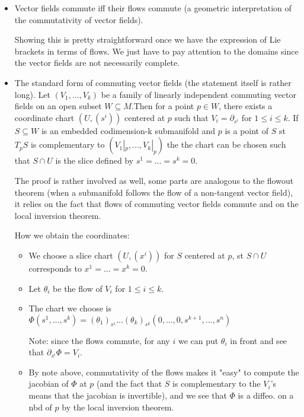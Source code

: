 \documentclass{report}
\theoremstyle{definition}
\begin{document}
\begin{itemize}
    \item Vector fields commute iff their flows commute (a geometric interpretation of the commutativity of vector fields).

    Showing this is pretty straightforward once we have the expression of Lie brackets in terms of flows. We just have to pay attention to the domains since the vector fields are not necessarily complete.
    \item \label{StandardFormCommutingFields} The standard form of commuting vector fields (the statement itself is rather long). Let $(V_1,...,V_k)$ be a family of linearly independent commuting vector fields on an open subset $W\subseteq M$.Then for a point $p\in W$, there exists a coordinate chart $(U,(s^i))$ centered at $p$ such that $V_i=\partial_{s^i}$ for $1\leq i\leq k$. If $S\subseteq W$ is an embedded codimension-k submanifold and $p$ is a point of $S$ st $T_pS$ is complementary to $(V_1|_p,...,V_k|_p)$ the the chart can be chosen such that $S\cap U$ is the slice defined by $s^1=...=s^k=0$.

    The proof is rather involved as well, some parts are analogous to the flowout theorem (when a submanifold follows the flow of a non-tangent vector field), it relies on the fact that flows of commuting vector fields commute and on the local inversion theorem.

    How we obtain the coordinates:
    \begin{itemize}
        \item We choose a slice chart $(U,(x^i))$ for $S$ centered at $p$, st $S\cap U$ corresponds to $x^1=...=x^k=0$.
        \item Let $\theta_i$ be the flow of $V_i$ for $1\leq i\leq k$.
        \item The chart we choose is $\Phi(s^1,...,s^k)=(\theta_1)_{s^1}...(\theta_k)_{s^k}(0,...,0,s^{k+1},...,s^n)$

        Note: since the flows commute, for any $i$ we can put $\theta_i$ in front and see that $\partial_{s^i}\Phi=V_i$.
        \item By note above, commutativity of the flows makes it "easy" to compute the jacobian of $\Phi$ at $p$ (and the fact that $S$ is complementary to the $V_i$'s means that the jacobian is invertible), and we see that $\Phi$ is a diffeo. on a nbd of $p$ by the local inversion theorem.
    \end{itemize}
\end{itemize}
\end{document}
